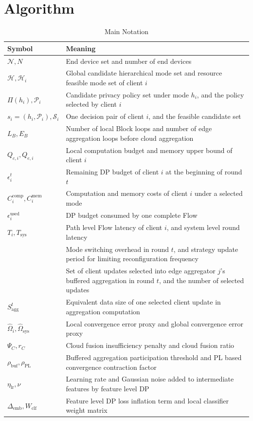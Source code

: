 ﻿\documentclass[preprint,12pt]{elsarticle}
\theoremstyle{plain}
\theoremstyle{definition}
\theoremstyle{remark}
\begin{document}
\section{Algorithm}
\label{sec:algorithm}
\begin{table}[t]
\caption{Main Notation}
\label{tab:notations}
\centering
\begin{tabular}{p{}p{}}
\hline\hline
\textbf{Symbol} & \textbf{Meaning} \\
\hline
\(\mathcal{N}, N\) & End device set and number of end devices \\
\(\mathcal{H}, \mathcal{H}_i\) & Global candidate hierarchical mode set and resource feasible mode set of client \(i\) \\
\(\Pi(h_i), \mathcal{P}_i\) & Candidate privacy policy set under mode \(h_i\), and the policy selected by client \(i\) \\
\(s_i=(h_i,\mathcal{P}_i),\mathcal{S}_i\) & One decision pair of client \(i\), and the feasible candidate set \\
\(L_B,E_B\) & Number of local Block loops and number of edge aggregation loops before cloud aggregation \\
\(Q_{c,i}, Q_{e,i}\) & Local computation budget and memory upper bound of client \(i\) \\
\(\epsilon_i^t\) & Remaining DP budget of client \(i\) at the beginning of round \(t\) \\
\(C_i^{\mathrm{comp}}, C_i^{\mathrm{mem}}\) & Computation and memory costs of client \(i\) under a selected mode \\
\(\epsilon_i^{\mathrm{used}}\) & DP budget consumed by one complete Flow \\
\(T_i, T_{\mathrm{sys}}\) & Path level Flow latency of client \(i\), and system level round latency \\
\added[id=R1]{\(C_i^{\mathrm{sw},t}, S_P\) & Mode switching overhead in round \(t\), and strategy update period for limiting reconfiguration frequency \\}
\(S_j^t,\lvert S_j^t\rvert\) & Set of client updates selected into edge aggregator \(j\)'s buffered aggregation in round \(t\), and the number of selected updates \\
\(S_{\mathrm{agg}}^t\) & Equivalent data size of one selected client update in aggregation computation \\
\(\widehat{\Omega}_i, \widehat{\Omega}_{\mathrm{sys}}\) & Local convergence error proxy and global convergence error proxy \\
\(\Psi_C, r_C\) & Cloud fusion insufficiency penalty and cloud fusion ratio \\
\(\rho_{\mathrm{buf}},\rho_{\mathrm{PL}}\) & Buffered aggregation participation threshold and PL based convergence contraction factor \\
\(\eta_{\mathrm{lr}},\nu\) & Learning rate and Gaussian noise added to intermediate features by feature level DP \\
\(\Delta_{\mathrm{emb}},W_{\mathrm{clf}}\) & Feature level DP loss inflation term and local classifier weight matrix \\
\hline\hline
\end{tabular}
\end{table}
\end{document}
